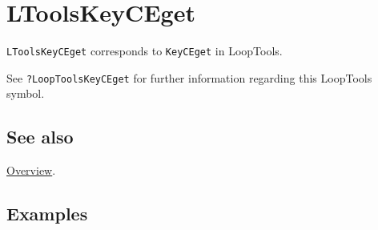 \documentclass[../FeynHelpersManual.tex]{subfiles}
\begin{document}
\hypertarget{ltoolskeyceget}{
\section{LToolsKeyCEget}\label{ltoolskeyceget}}

\texttt{LToolsKeyCEget} corresponds to \texttt{KeyCEget} in LoopTools.

See \texttt{?LoopTools\textasciigrave KeyCEget} for further information
regarding this LoopTools symbol.

\subsection{See also}

\hyperlink{toc}{Overview}.

\subsection{Examples}
\end{document}
